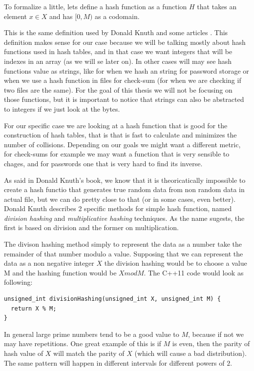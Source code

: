 \bigskip

To formalize a little, lets define a hash function as a function \( H \) that takes an element \( x \in X \) and has \( [0, M) \) as a codomain.

This is the same definition used by Donald Knuth \cite{TAOCP3} and some articles \cite{RobinHoodHashing}. This definition makes sense for our case because we will be talking mostly about hash functions used in hash tables, and in that case we want integers that will be indexes in an array (as we will se later on). In other cases will may see hash functions value as strings, like for when we hash an string for password storage or when we use a hash function in files for check-sum (for when we are checking if two files are the same). For the goal of this thesis we will not be focusing on those functions, but it is important to notice that strings can also be abstracted to integers if we just look at the bytes.

For our specific case we are looking at a hash function that is good for the construction of hash tables, that is that is fast to calculate and minimizes the number of collisions. Depending on our goals we might want a different metric, for check-sums for example we may want a function that is very sensible to chages, and for passwords one that is very hard to find its inverse.

As said in Donald Knuth's book, we know that it is theoricatically impossible to create a hash functio that generates true random data from non random data in actual file, but we can do pretty close to that (or in some cases, even better).  Donald Knuth describes 2 specific methods for simple hash function, named \textit{division hashing} and \textit{multiplicative hashing} techniques. As the name sugests, the first is based on division and the former on multiplication.

The divison hashing method simply to represent the data as a number take the remainder of that number modulo a value. Supposing that we can represent the data as a non negative integer \( X \) the division hashing would be to choose a value M and the hashing function would be \( X mod M \). The C++11 code would look as following:

\begin{lstlisting}
unsigned_int divisionHashing(unsigned_int X, unsigned_int M) {
  return X % M;
}
\end{lstlisting}

In general large prime numbers tend to be a good value to \( M \), because if not we may have repetitions. One great example of this is if \( M \) is even, then the parity of hash value of \( X \) will match the parity of \( X \) (which will cause a bad distribution). The same pattern will happen in different intervals for different powers of \( 2 \).

